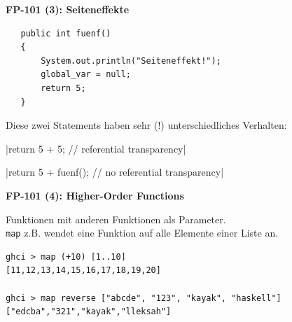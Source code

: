 \documentclass{beamer}
\begin{document}
\begin{frame}[fragile]
    \begin{center}
        \Large\textbf{FP-101 (3): Seiteneffekte}\\ \bigskip \normalsize    
    
\begin{verbatim}
   public int fuenf()
   {
       System.out.println("Seiteneffekt!");
       global_var = null;
       return 5;
   }
\end{verbatim} 
    \end{center}

Diese zwei Statements haben sehr (!) unterschiedliches Verhalten:    
    
    |return 5 + 5;       // referential transparency|

    |return 5 + fuenf(); // no referential transparency|  

\end{frame}
  
  
\begin{frame}[fragile]
    \begin{center}
     \Large\textbf{FP-101 (4): Higher-Order Functions}\\ \bigskip \normalsize    
    \end{center}
    
    Funktionen mit anderen Funktionen als Parameter.\\
    \texttt{map} z.B. wendet eine Funktion auf alle Elemente einer Liste an. 

\begin{verbatim}
ghci > map (+10) [1..10]
[11,12,13,14,15,16,17,18,19,20]

ghci > map reverse ["abcde", "123", "kayak", "haskell"]
["edcba","321","kayak","lleksah"]
\end{verbatim}    
    
\end{frame}
  
\end{document}
